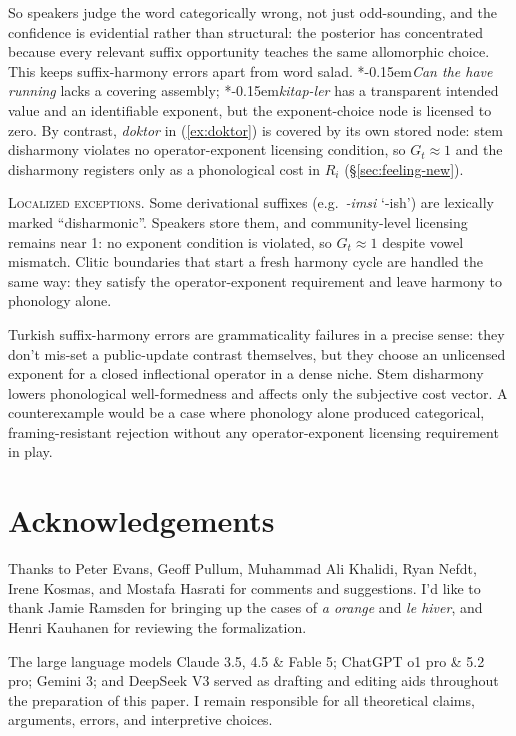 \documentclass[12pt,letterpaper]{article}
\newcommand{\mention}[1]{\textit{#1}}
\newcommand{\olang}[1]{\textit{#1}}
\newcommand{\judgesep}{\kern-0.15em}
\newcommand{\ungram}[1]{*\judgesep#1}
\begin{document}
So speakers judge the word categorically wrong, not just odd-sounding, and the
confidence is evidential rather than structural: the posterior has concentrated
because every relevant suffix opportunity teaches the same allomorphic choice.
This keeps suffix-harmony errors apart from word salad. \ungram{\mention{Can the
have running}} lacks a covering assembly; \ungram{\mention{kitap-ler}} has a
transparent intended value and an identifiable exponent, but the exponent-choice
node is licensed to zero. By contrast, \mention{doktor} in (\ref{ex:doktor}) is
covered by its own stored node: stem disharmony violates no operator-exponent
licensing condition, so $G_t\approx1$ and the disharmony registers only as a
phonological cost in $R_i$ (\S\ref{sec:feeling-new}).

\noindent\textsc{Localized exceptions.} Some derivational suffixes (e.g.~\mention{-imsi} `-ish') are lexically
marked \enquote{disharmonic}. Speakers store them, and community-level licensing remains near 1: no
exponent condition is violated, so $G_t\approx1$ despite vowel mismatch. Clitic
boundaries that start a fresh harmony cycle \autocite{KabakVogel2001} are
handled the same way: they satisfy the operator-exponent requirement and leave
harmony to phonology alone.

Turkish suffix-harmony errors are grammaticality failures in a precise sense:
they don't mis-set a public-update contrast themselves, but they choose an
unlicensed exponent for a closed inflectional operator in a dense niche. Stem
disharmony lowers phonological well-formedness and affects only the subjective
cost vector. A counterexample would be a case where phonology alone produced
categorical, framing-resistant rejection without any operator-exponent licensing
requirement in play.


\newpage
\section*{Acknowledgements}
Thanks to Peter Evans, Geoff Pullum, Muhammad Ali Khalidi, Ryan Nefdt, Irene Kosmas, and Mostafa Hasrati for comments and suggestions. I'd like to thank Jamie Ramsden for bringing up the cases of \mention{a orange} and \olang{le hiver}, and Henri Kauhanen for reviewing the formalization.

The large language models Claude 3.5, 4.5 \& Fable 5; ChatGPT o1 pro \& 5.2 pro; Gemini 3; and DeepSeek V3 served as drafting and editing aids throughout the preparation of this paper. I remain responsible for all theoretical claims, arguments, errors, and interpretive choices.

\newpage
\begin{sloppypar}
\printbibliography[title=References]
\end{sloppypar}
\end{document}
